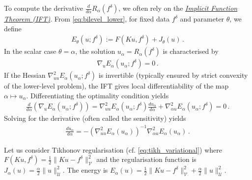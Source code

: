 \begin{enumerate}
    To compute the derivative $\frac{d}{d\alpha} R_{\alpha}(f^\delta)$, we often rely on the \href{https://en.wikipedia.org/wiki/Implicit_function_theorem}{\emph{Implicit Function Theorem (IFT)}}. From \eqref{eq:bilevel_lower}, for fixed data $f^\delta$ and parameter $\theta$, we define
    \begin{align*}
        E_\theta(u; f^\delta) := F(Ku, f^\delta) + J_\theta(u) \, .
    \end{align*}
    In the scalar case $\theta=\alpha$, the solution $u_\alpha = R_\alpha(f^\delta)$ is characterised by
    \begin{align*}
        \nabla_u E_\alpha(u_\alpha; f^\delta) = 0 \, .
    \end{align*}
    If the Hessian $\nabla_{uu}^2 E_\alpha(u_\alpha; f^\delta)$ is invertible (typically ensured by strict convexity of the lower-level problem), the IFT gives local differentiability of the map $\alpha \mapsto u_\alpha$. Differentiating the optimality condition yields
    \begin{align*}
        \frac{d}{d\alpha} \left( \nabla_u E_\alpha(u_\alpha; f^\delta) \right)
        = \nabla_{uu}^2 E_\alpha(u_\alpha; f^\delta) \frac{du_\alpha}{d\alpha}
        + \nabla_{\alpha u}^2 E_\alpha(u_\alpha; f^\delta) = 0 \, .
    \end{align*}
    Solving for the derivative (often called the sensitivity) yields
    \begin{align}
        \frac{du_\alpha}{d\alpha} = - \left( \nabla_{uu}^2 E_\alpha(u_\alpha) \right)^{-1} \nabla_{\alpha u}^2 E_\alpha(u_\alpha) \, . \label{eq:bilevel_sensitivity}
    \end{align}

    \begin{exm}\label{exm:bilevel_tikhonov}\normalfont
    Let us consider Tikhonov regularisation (cf. \eqref{eq:tikh_variational}) where $F(K u, f^\delta) = \frac{1}{2}\|K u - f^\delta\|_{\mathcal{V}}^2$ and the regularisation function is $J_\alpha(u) = \frac{\alpha}{2}\|u\|_{\mathcal{U}}^2$. The energy is $E_\alpha(u) = \frac{1}{2}\|K u - f^\delta\|_{\mathcal{V}}^2 + \frac{\alpha}{2}\|u\|_{\mathcal{U}}^2$.


\end{exm}
\end{enumerate}
